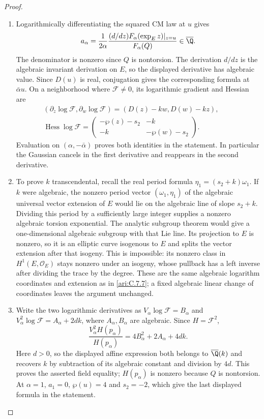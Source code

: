 \begin{proof}
\begin{enumerate}[label=\arabic*.,leftmargin=*]
\item Logarithmically differentiating the squared CM law at $u$
gives
\[
 a_\alpha=\frac{1}{2\alpha}
     \frac{(d/dz)F_\alpha(\exp_Ez)|_{z=u}}{F_\alpha(Q)}
                  \in\overline{\Q}.
\]
The denominator is nonzero since $Q$ is nontorsion. The
derivation $d/dz$ is the algebraic invariant derivation on
$E$, so the displayed derivative has algebraic value.
Since $D(u)$ is real, conjugation gives the corresponding
formula at $\bar\alpha u$. On a neighborhood where
$\mathcal F\ne0$, its logarithmic gradient and Hessian are
\label{layout:I:3}
\[
\begin{gathered}
(\partial_z\log\mathcal F,\partial_w\log\mathcal F)
       =(D(z)-kw,D(w)-kz),\qquad
 \\
\operatorname{Hess}\log\mathcal F=
 \begin{pmatrix}-\wp(z)-s_2&-k\\-k&-\wp(w)-s_2\end{pmatrix}.
\end{gathered}
\]
Evaluation on $(\alpha,-\bar\alpha)$ proves both identities
in the statement. In particular the Gaussian cancels in the
first derivative and reappears in the second derivative.

\item To prove $k$ transcendental, recall the real period formula
$\eta_1=(s_2+k)\omega_1$. If $k$ were algebraic, the
nonzero period vector $(\omega_1,\eta_1)$ of the algebraic
universal vector extension of $E$ would lie on the algebraic
line of slope $s_2+k$. Dividing this period by a sufficiently
large integer supplies a nonzero algebraic torsion exponential.
The analytic subgroup theorem
\citep[Theorem~6.1, arXiv v8, p.~43]{huber2022} would give a one-dimensional
algebraic subgroup with that Lie line. Its projection to $E$
is nonzero, so it is an elliptic curve isogenous to $E$ and
splits the vector extension after that isogeny. This is
impossible: its nonzero class in $H^1(E,\mathcal O_E)$ stays
nonzero under an isogeny, whose pullback has a left inverse
after dividing the trace by the degree. These are the same
algebraic logarithm coordinates and extension as in \ref{ari:C.7.7};
a fixed algebraic linear change of coordinates leaves the
argument unchanged.

\item Write the two logarithmic derivatives as
$V_\alpha\log\mathcal F=B_\alpha$ and
$V_\alpha^2\log\mathcal F=A_\alpha+2dk$, where
$A_\alpha,B_\alpha$ are algebraic. Since $H=\mathcal F^2$,
\[
 \frac{V_\alpha^2H(p_\alpha)}{H(p_\alpha)}
       =4B_\alpha^2+2A_\alpha+4dk.
\]
Here $d>0$, so the displayed affine expression both belongs to
$\overline\Q(k)$ and recovers $k$ by subtraction of its algebraic
constant and division by $4d$. This proves the asserted field
equality; $H(p_\alpha)$ is nonzero because $Q$ is nontorsion.
At $\alpha=1$, $a_1=0$, $\wp(u)=4$ and $s_2=-2$,
which give the last displayed formula in the statement.


\end{enumerate}
\end{proof}
